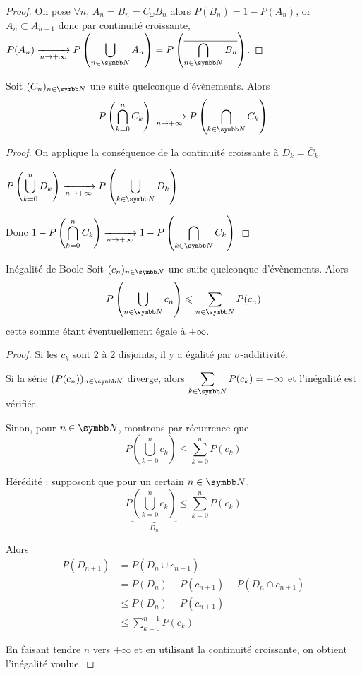 \begin{proof}
    On pose $\forall n, \, A_n = \bar B_n = C_\omega B_n$ alors 
    $P(B_n) = 1 - P(A_n)$, or $A_n \subset A_{n + 1}$ donc par continuité croissante, 
    $\displaystyle P(A_n) \xrightarrow[n \to + \infty]{} P\left( \bigcup_{n \in \N} A_n \right) = P\left( \overline{ \bigcap_{n \in \N} B_n } \right)$.
\end{proof}

\begin{proposition}{}{}
    Soit $(C_n)_{n \in \N}$ une suite quelconque d'évènements. Alors
    $$P\left( \bigcap_{k = 0}^n C_k \right) \xrightarrow[n \to + \infty]{} P\left( \bigcap_{k \in \N} C_k \right)$$
\end{proposition}

\begin{proof}
    On applique la conséquence de la continuité croissante à $D_k = \bar C_k$.

    $\displaystyle P\left( \bigcup_{k = 0}^n D_k \right) \xrightarrow[n \to + \infty]{} P\left( \bigcup_{k \in \N} D_k \right)$

    Donc $\displaystyle 1 - P\left( \bigcap_{k = 0}^n C_k \right) \xrightarrow[n \to + \infty]{} 1 - P\left( \bigcap_{k \in \N} C_k \right)$
\end{proof}

\begin{theoreme}{Inégalité de Boole}{}
    Soit $(c_n)_{n \in \N}$ une suite quelconque  d'évènements. Alors 
    $$ P\left( \bigcup_{n \in \N} c_n \right) \leqslant \sum_{n \in \N} P(c_n) $$
    cette somme étant éventuellement égale à $+ \infty$.
\end{theoreme}

\begin{proof}
    Si les $c_k$ sont 2 à 2 disjoints, il y a égalité par $\sigma$-additivité.


    \svspace Si la série $(P(c_n))_{n \in \N}$ diverge, alors 
    $\displaystyle \sum_{k \in \N} P(c_k) = + \infty$ et l'inégalité est vérifiée.

    
    \svspace Sinon, pour $n \in \N$, montrons par récurrence que 
    $$ P\left( \bigcup_{k = 0}^n c_k \right) \leqslant \sum_{k = 0}^n P(c_k) $$

    Hérédité : supposont que pour un certain $n \in \N$, $$P \underbrace{\left( \bigcup_{k = 0}^n c_k \right) }_{D_n} \leqslant \sum_{k = 0}^n P(c_k) $$

    Alors 
    \begin{align}
        P(D_{n + 1}) & = P(D_n \cup c_{n + 1}) \\
        & = P(D_n) + P(c_{n + 1}) - P(D_n \cap c_{n + 1}) \\
        & \leqslant P(D_n) + P(c_{n + 1}) \\
        & \leqslant \sum_{k = 0}^{n + 1} P(c_k)
    \end{align}

    En faisant tendre $n$ vers $+ \infty$ et en utilisant la continuité croissante, on obtient l'inégalité voulue.
\end{proof}

